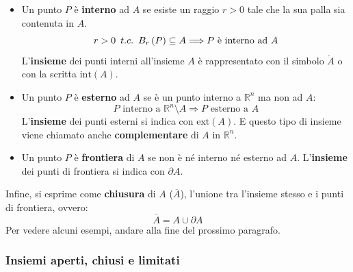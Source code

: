 \documentclass[a4paper]{article}
\newcommand{\definition}[1]{\textcolor{Red3}{\textbf{#1}}}
\begin{document}
	\begin{itemize}
		\item Un punto $P$ è \definition{interno} ad $A$ se esiste un raggio $r>0$ tale che la sua palla sia contenuta in $A$.
		\begin{equation*}
			r > 0 \hspace{.5em} t.c. \hspace{.5em} B_{r}\left(P\right) \subseteq A \Longrightarrow P \text{ è interno ad } A 
		\end{equation*}
		L'\textbf{insieme} dei punti interni all'insieme $A$ è rappresentato con il simbolo $\mathring{A}$ o con la scritta $\mathrm{int}\left(A\right)$.

		\item Un punto $P$ è \definition{esterno} ad $A$ se è un punto interno a $\mathbb{R}^{n}$ ma non ad $A$:
		\begin{equation*}
			P \text{ interno a } \mathbb{R}^{n} \setminus A \Longrightarrow P \text{ esterno a } A
		\end{equation*}
		L'\textbf{insieme} dei punti esterni si indica con $\mathrm{ext}\left(A\right)$. E questo tipo di insieme viene chiamato anche \textbf{complementare} di $A$ in $\mathbb{R}^{n}$.

		\item Un punto $P$ è \definition{frontiera} di $A$ se non è né interno né esterno ad $A$. L'\textbf{insieme} dei punti di frontiera si indica con $\partial A$.
	\end{itemize}
	Infine, si esprime come \definition{chiusura} di $A$ ($\overline{A}$), l'unione tra l'insieme stesso e i punti di frontiera, ovvero:
	\begin{equation*}
		\overline{A} = A \cup \partial A
	\end{equation*}
	Per vedere alcuni esempi, andare alla fine del prossimo paragrafo.\newpage

	\subsubsection{Insiemi aperti, chiusi e limitati}\label{subsubsection: insiemi aperti, chiusi e limitati}
\end{document}
